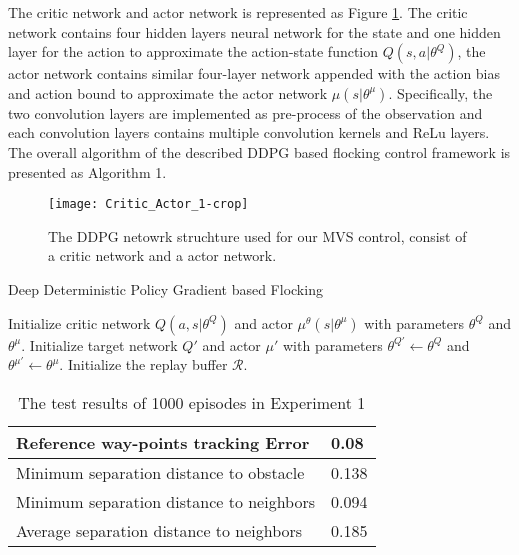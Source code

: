 \documentclass[letterpaper,10 pt,conference]{ieeeconf}
\begin{document}
The critic network and actor network is represented as Figure \ref{fig:Critic_Actor-crop}. The critic network contains four hidden  layers neural network for the state and one hidden layer for the action to approximate the action-state function $Q(s,a|\theta^Q)$, the actor network contains similar four-layer network appended with the action bias and action bound to approximate the actor network $\mu(s|\theta^{\mu})$.
Specifically, the two convolution layers are implemented as pre-process of the observation and each convolution layers contains multiple convolution kernels and ReLu layers. The overall algorithm of the described DDPG based flocking control framework is presented as Algorithm 1.
\begin{figure}
	\centering
	\texttt{[image: Critic\_Actor\_1-crop]}
	\caption{The DDPG netowrk struchture used for our MVS control, consist of a critic network and a actor network.}
	\label{fig:Critic_Actor-crop}
\end{figure}
\begin{algorithm}
	\caption{Deep Deterministic Policy Gradient based Flocking}
	Initialize critic network $Q\left(a,s|\theta^Q\right)$ and actor $\mu^{\theta}\left(s|\theta^\mu\right)$ with parameters $\theta^Q$ and $\theta^\mu$.
	Initialize target network $Q'$ and actor $\mu'$ with parameters $\theta^{Q'}\leftarrow\theta^Q$ and $\theta^{\mu'}\leftarrow\theta^\mu$.
	Initialize the replay buffer $\mathcal{R}$.\\
\end{algorithm}
\begin{table}
	\centering
	\caption{The test results of 1000 episodes in Experiment 1}
	\label{my-label}
	\begin{tabular}{|l|l|}\hline
		Reference way-points tracking Error   & 0.08\\ \hline
		Minimum separation distance to obstacle & 0.138 \\\hline
		Minimum separation distance to neighbors & 0.094\\\hline
		Average separation distance to neighbors & 0.185\\\hline 
	\end{tabular}
\end{table}
\end{document}
